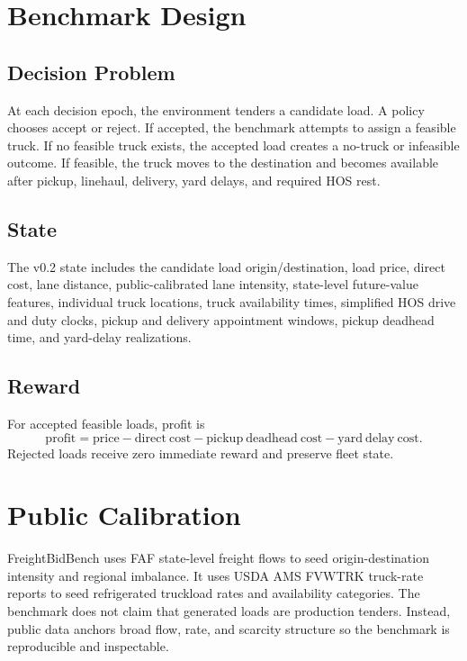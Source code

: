 \documentclass[11pt]{article}
\begin{document}
\section{Benchmark Design}

\subsection{Decision Problem}

At each decision epoch, the environment tenders a candidate load. A policy
chooses accept or reject. If accepted, the benchmark attempts to assign a
feasible truck. If no feasible truck exists, the accepted load creates a
no-truck or infeasible outcome. If feasible, the truck moves to the destination
and becomes available after pickup, linehaul, delivery, yard delays, and
required HOS rest.

\subsection{State}

The v0.2 state includes the candidate load origin/destination, load price,
direct cost, lane distance, public-calibrated lane intensity, state-level
future-value features, individual truck locations, truck availability times,
simplified HOS drive and duty clocks, pickup and delivery appointment windows,
pickup deadhead time, and yard-delay realizations.

\subsection{Reward}

For accepted feasible loads, profit is
\[
  \mathrm{profit} = \mathrm{price} - \mathrm{direct\ cost}
  - \mathrm{pickup\ deadhead\ cost} - \mathrm{yard\ delay\ cost}.
\]
Rejected loads receive zero immediate reward and preserve fleet state.

\section{Public Calibration}

FreightBidBench uses FAF state-level freight flows to seed
origin-destination intensity and regional imbalance. It uses USDA AMS FVWTRK
truck-rate reports to seed refrigerated truckload rates and availability
categories. The benchmark does not claim that generated loads are production
tenders. Instead, public data anchors broad flow, rate, and scarcity structure
so the benchmark is reproducible and inspectable.
\end{document}
